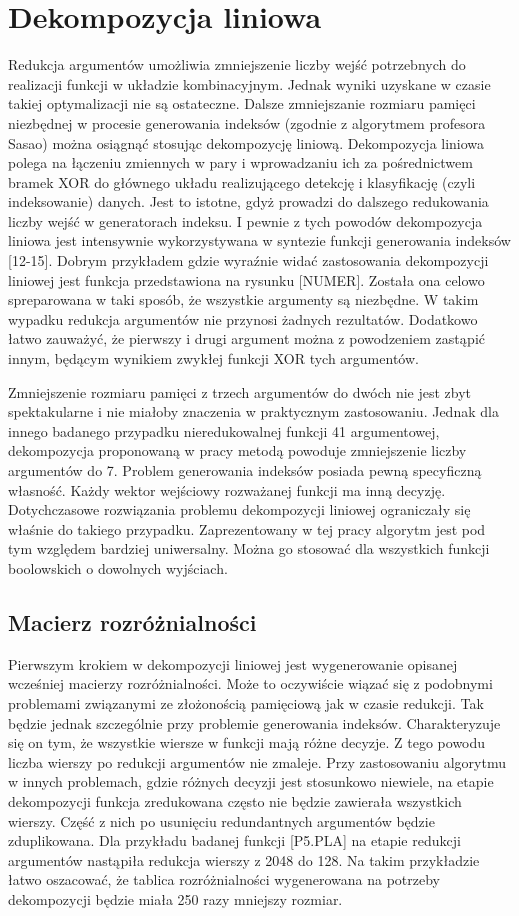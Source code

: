 \chapter{Dekompozycja liniowa}

Redukcja argumentów umożliwia zmniejszenie liczby wejść potrzebnych do realizacji funkcji w układzie kombinacyjnym. Jednak wyniki uzyskane w czasie takiej optymalizacji nie są ostateczne. Dalsze zmniejszanie rozmiaru pamięci niezbędnej w procesie generowania indeksów (zgodnie z algorytmem profesora Sasao) można osiągnąć stosując dekompozycję liniową.
Dekompozycja liniowa polega na  łączeniu zmiennych w pary i wprowadzaniu ich za pośrednictwem bramek XOR do głównego układu realizującego detekcję i klasyfikację (czyli indeksowanie) danych. Jest to istotne, gdyż prowadzi do dalszego redukowania liczby wejść w generatorach indeksu. I pewnie z tych powodów dekompozycja liniowa jest intensywnie wykorzystywana w syntezie funkcji generowania indeksów [12-15].
Dobrym przykładem gdzie wyraźnie widać zastosowania dekompozycji liniowej jest funkcja przedstawiona na rysunku [NUMER]. Została ona celowo spreparowana w taki sposób, że wszystkie argumenty są niezbędne. W takim wypadku redukcja argumentów nie przynosi żadnych rezultatów. Dodatkowo łatwo zauważyć, że pierwszy i drugi argument można z powodzeniem zastąpić innym, będącym wynikiem zwykłej funkcji XOR tych argumentów.

Zmniejszenie rozmiaru pamięci z trzech argumentów do dwóch nie jest zbyt spektakularne i nie miałoby znaczenia w praktycznym zastosowaniu. Jednak dla innego badanego przypadku nieredukowalnej funkcji 41 argumentowej, dekompozycja proponowaną w pracy metodą powoduje zmniejszenie liczby argumentów do 7.
Problem generowania indeksów posiada pewną specyficzną własność. Każdy wektor wejściowy rozważanej funkcji ma inną decyzję. Dotychczasowe rozwiązania problemu dekompozycji liniowej ograniczały się właśnie do takiego przypadku. Zaprezentowany w tej pracy algorytm jest pod tym względem bardziej uniwersalny. Można go stosować dla wszystkich funkcji boolowskich o dowolnych wyjściach.

\section{Macierz rozróżnialności}

Pierwszym krokiem w dekompozycji liniowej jest wygenerowanie opisanej wcześniej macierzy rozróżnialności. Może to oczywiście wiązać się z podobnymi problemami związanymi ze złożonością pamięciową jak w czasie redukcji. Tak będzie jednak szczególnie przy problemie generowania indeksów. Charakteryzuje się on tym, że wszystkie wiersze w funkcji mają różne decyzje. Z tego powodu liczba wierszy po redukcji argumentów nie zmaleje.
Przy zastosowaniu algorytmu w innych problemach, gdzie różnych decyzji jest stosunkowo niewiele, na etapie dekompozycji funkcja zredukowana często nie będzie zawierała wszystkich wierszy. Część z nich po usunięciu redundantnych argumentów będzie zduplikowana. Dla przykładu badanej funkcji [P5.PLA] na etapie redukcji argumentów nastąpiła redukcja wierszy z 2048 do 128. Na takim przykładzie łatwo oszacować, że tablica rozróżnialności wygenerowana na potrzeby dekompozycji będzie miała 250 razy mniejszy rozmiar.

